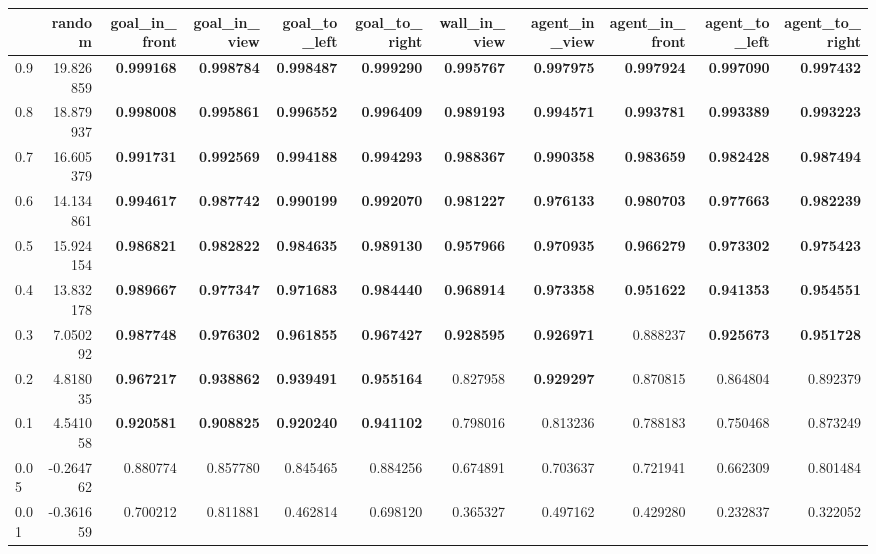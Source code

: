 \begin{tabular}{lrrrrrrrrrr}
\toprule
 & random & goal\_in\_front & goal\_in\_view & goal\_to\_left & goal\_to\_right & wall\_in\_view & agent\_in\_view & agent\_in\_front & agent\_to\_left & agent\_to\_right \\
\midrule
0.9 & 19.826859 & \bfseries 0.999168 & \bfseries 0.998784 & \bfseries 0.998487 & \bfseries 0.999290 & \bfseries 0.995767 & \bfseries 0.997975 & \bfseries 0.997924 & \bfseries 0.997090 & \bfseries 0.997432 \\
0.8 & 18.879937 & \bfseries 0.998008 & \bfseries 0.995861 & \bfseries 0.996552 & \bfseries 0.996409 & \bfseries 0.989193 & \bfseries 0.994571 & \bfseries 0.993781 & \bfseries 0.993389 & \bfseries 0.993223 \\
0.7 & 16.605379 & \bfseries 0.991731 & \bfseries 0.992569 & \bfseries 0.994188 & \bfseries 0.994293 & \bfseries 0.988367 & \bfseries 0.990358 & \bfseries 0.983659 & \bfseries 0.982428 & \bfseries 0.987494 \\
0.6 & 14.134861 & \bfseries 0.994617 & \bfseries 0.987742 & \bfseries 0.990199 & \bfseries 0.992070 & \bfseries 0.981227 & \bfseries 0.976133 & \bfseries 0.980703 & \bfseries 0.977663 & \bfseries 0.982239 \\
0.5 & 15.924154 & \bfseries 0.986821 & \bfseries 0.982822 & \bfseries 0.984635 & \bfseries 0.989130 & \bfseries 0.957966 & \bfseries 0.970935 & \bfseries 0.966279 & \bfseries 0.973302 & \bfseries 0.975423 \\
0.4 & 13.832178 & \bfseries 0.989667 & \bfseries 0.977347 & \bfseries 0.971683 & \bfseries 0.984440 & \bfseries 0.968914 & \bfseries 0.973358 & \bfseries 0.951622 & \bfseries 0.941353 & \bfseries 0.954551 \\
0.3 & 7.050292 & \bfseries 0.987748 & \bfseries 0.976302 & \bfseries 0.961855 & \bfseries 0.967427 & \bfseries 0.928595 & \bfseries 0.926971 & 0.888237 & \bfseries 0.925673 & \bfseries 0.951728 \\
0.2 & 4.818035 & \bfseries 0.967217 & \bfseries 0.938862 & \bfseries 0.939491 & \bfseries 0.955164 & 0.827958 & \bfseries 0.929297 & 0.870815 & 0.864804 & 0.892379 \\
0.1 & 4.541058 & \bfseries 0.920581 & \bfseries 0.908825 & \bfseries 0.920240 & \bfseries 0.941102 & 0.798016 & 0.813236 & 0.788183 & 0.750468 & 0.873249 \\
0.05 & -0.264762 & 0.880774 & 0.857780 & 0.845465 & 0.884256 & 0.674891 & 0.703637 & 0.721941 & 0.662309 & 0.801484 \\
0.01 & -0.361659 & 0.700212 & 0.811881 & 0.462814 & 0.698120 & 0.365327 & 0.497162 & 0.429280 & 0.232837 & 0.322052 \\
\bottomrule
\end{tabular}